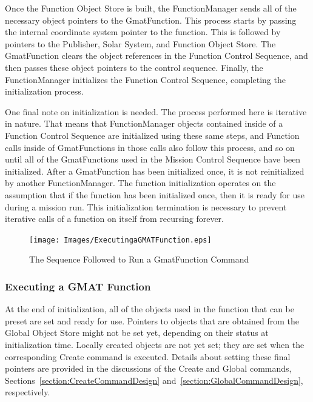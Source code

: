 Once the Function Object Store is built, the FunctionManager sends all of the necessary object
pointers to the GmatFunction.  This process starts by passing the internal coordinate system pointer
to the function.  This is followed by pointers to the Publisher, Solar System, and Function Object
Store.  The GmatFunction clears the object references in the Function Control Sequence, and then
passes these object pointers to the control sequence.  Finally, the FunctionManager initializes the
Function Control Sequence, completing the initialization process.

One final note on initialization is needed.  The process performed here is iterative in nature. 
That means that FunctionManager objects contained inside of a Function Control Sequence are
initialized using these same steps, and Function calls inside of GmatFunctions in those calls also
follow this process, and so on until all of the GmatFunctions used in the Mission Control Sequence
have been initialized.  After a GmatFunction has been initialized once, it is not reinitialized by
another FunctionManager.  The function initialization operates on the assumption that if the
function has been initialized once, then it is ready for use during a mission run.  This
initialization termination is necessary to prevent iterative calls of a function on itself from
recursing forever.

\begin{figure}[H]
\begin{center}
\texttt{[image: Images/ExecutingaGMATFunction.eps]}
\caption{\label{figure:GmatFunctionExecution}The Sequence Followed to Run a GmatFunction
Command}
\end{center}
\end{figure}

\subsubsection{Executing a GMAT Function}

At the end of initialization, all of the objects used in the function that can be preset are set and
ready for use.  Pointers to objects that are obtained from the Global Object Store might not be set
yet, depending on their status at initialization time.  Locally created objects are not yet set;
they are set when the corresponding Create command is executed.  Details about setting these final
pointers are provided in the discussions of the Create and Global commands,
Sections~\ref{section:CreateCommandDesign} and~\ref{section:GlobalCommandDesign}, respectively.

